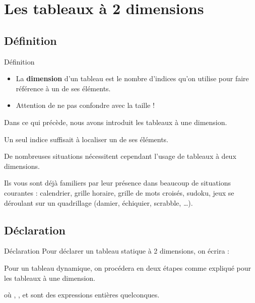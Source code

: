 \section{Les tableaux à 2 dimensions}

\subsection{Définition}

\begin{frame}{Définition}
	\begin{itemize}
		\item
		La \textbf{dimension} d’un tableau est le nombre d’indices qu’on utilise
		pour faire référence à un de ses éléments. 
		\item
		Attention de ne pas confondre avec la	taille !
	\end{itemize}
	
	Dans ce qui précède, nous avons introduit les tableaux à une dimension.
	
	Un seul indice suffisait à localiser un de ses éléments. 
	
	De nombreuses	situations nécessitent cependant 
	l’usage de tableaux à deux dimensions.
	
	Ils vous sont déjà familiers par leur présence dans beaucoup de
	situations courantes : calendrier, grille horaire, grille de mots
	croisés, sudoku, jeux se déroulant sur un quadrillage (damier,
	échiquier, scrabble, \dots).
\end{frame}

\subsection{Déclaration}

\begin{frame}{Déclaration}
	Pour déclarer un tableau statique à 2 dimensions, on écrira :

	
	Pour un tableau dynamique, on procédera en deux étapes comme expliqué
	pour les tableaux à une dimension. 
	

	où , , 
	 et sont des
	expressions entières quelconques.
\end{frame}

